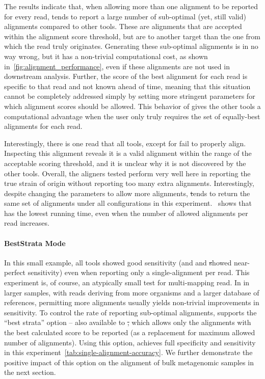 The results indicate that, when allowing more than one alignment to be reported for every read, \bt
tends to report a large number of sub-optimal (yet, still valid) alignments compared to other tools. 
These are alignments that are accepted within the alignment score threshold, but are to another target 
than the one from which the read truly originates. Generating these sub-optimal alignments is in no way 
wrong, but it has a non-trivial computational cost, as shown in~\cref{fig:alignment_performance}, even if 
these alignments are not used in downstream analysis. Further, the score of the best alignment for each 
read is specific to that read and not known ahead of time, meaning that this situation cannot be completely 
addressed simply by setting more stringent parameters for which alignment scores should be allowed. 
This behavior of \bt gives the other tools a computational advantage when the user only truly requires 
the set of equally-best alignments for each read.
    
Interestingly, there is one read that all tools, except for \puffaligner fail to properly align.
Inspecting this alignment reveals it is a valid alignment within the range of the acceptable scoring 
threshold, and it is unclear why it is not discovered by the other tools. Overall, the aligners tested 
perform very well here in reporting the true strain of origin without reporting too many extra alignments. 
Interestingly, despite changing the parameters to allow more alignments, \st tends to return the same set 
of alignments under all configurations in this experiment.~ shows 
that \puffaligner has the lowest running time, even when the number of allowed alignments per read increases.

\paragraph{BestStrata Mode}

In this small example, all tools showed good sensitivity (and 
\puffaligner and \st showed near-perfect sensitivity) even when reporting
only a single-alignment per read. This experiment is, of course, an
atypically small test for multi-mapping read. In in larger samples, with
reads deriving from more organisms and a larger database of references,
permitting more alignments usually yields non-trivial improvements in
sensitivity. To control the rate of reporting sub-optimal alignments,
\puffaligner supports the ``best strata'' option -- also available to
\st, which allows only the alignments with the best calculated score to
be reported (as a replacement for maximum allowed number of alignments).
Using this option, \puffaligner achieves full specificity and sensitivity
in this experiment~\cref{tab:single-alignment-accuracy}.
We further demonstrate the positive impact of this option on the
alignment of bulk metagenomic samples in the next section.

